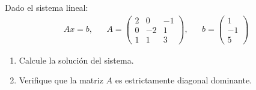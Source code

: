 \documentclass[12pt]{book}
\begin{document}
\eje  Dado el sistema lineal:
\begin{align*}
    Ax=b, & & A= \begin{pmatrix}
        2&0&-1\\
        0&-2&1\\
        1&1&3
    \end{pmatrix},& & b= \begin{pmatrix}
        1\\
        -1\\
        5
    \end{pmatrix}
\end{align*}
\renewcommand{\labelenumi}{(\alph{enumi})}
\begin{enumerate}
    \item Calcule la solución del sistema.
    \item Verifique que la matriz $A$ es estrictamente diagonal dominante.
\end{enumerate}
 
\end{document}
